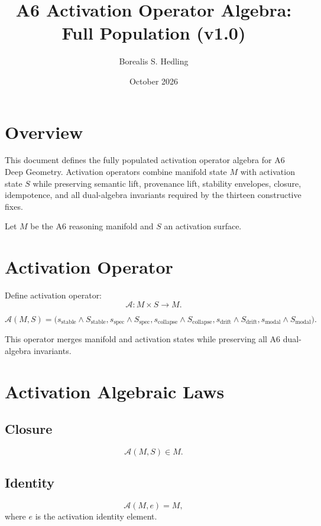 \documentclass[11pt]{article}
\title{A6 Activation Operator Algebra: Full Population (v1.0)}
\author{Borealis S. Hedling}
\date{October 2026}
\begin{document}
\maketitle

\section*{Overview}

This document defines the fully populated activation operator algebra for A6
Deep Geometry. Activation operators combine manifold state $M$ with activation
state $S$ while preserving semantic lift, provenance lift, stability envelopes,
closure, idempotence, and all dual-algebra invariants required by the thirteen
constructive fixes.

Let $M$ be the A6 reasoning manifold and $S$ an activation surface.

\section{Activation Operator}

Define activation operator:
\[
\mathcal{A} : M \times S \to M.
\]

\[
\mathcal{A}(M, S) =
  \big(
    s_{\mathrm{stable}} \land S_{\mathrm{stable}},
    s_{\mathrm{spec}} \land S_{\mathrm{spec}},
    s_{\mathrm{collapse}} \land S_{\mathrm{collapse}},
    s_{\mathrm{drift}} \land S_{\mathrm{drift}},
    s_{\mathrm{modal}} \land S_{\mathrm{modal}}
  \big).
\]

This operator merges manifold and activation states while preserving all A6
dual-algebra invariants.

\section{Activation Algebraic Laws}

\subsection{Closure}
\[
\mathcal{A}(M, S) \in M.
\]

\subsection{Identity}
\[
\mathcal{A}(M, e) = M,
\]
where $e$ is the activation identity element.
\end{document}
